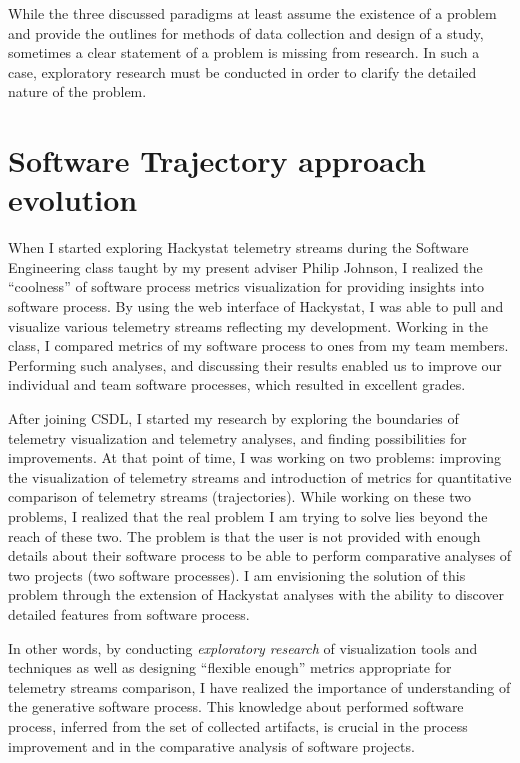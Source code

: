 While the three discussed paradigms at least assume the existence of a problem and provide the outlines for methods of data collection and design of a study, sometimes a clear statement of a problem is missing from research. In such a case, exploratory research must be conducted in order to clarify the detailed nature of the problem.

\section{Software Trajectory approach evolution}
When I started exploring Hackystat telemetry streams during the Software Engineering class taught by my present adviser Philip Johnson, I realized the ``coolness'' of software process metrics visualization for providing insights into software process. By using the web interface of Hackystat, I was able to pull and visualize various telemetry streams reflecting my development. Working in the class, I compared metrics of my software process to ones from my team members. Performing such analyses, and discussing their results enabled us to improve our individual and team software processes, which resulted in excellent grades. 

After joining CSDL, I started my research by exploring the boundaries of telemetry visualization and telemetry analyses, and finding possibilities for improvements. At that point of time, I was working on two problems: improving the visualization of telemetry streams and introduction of metrics for quantitative comparison of telemetry streams (trajectories). While working on these two problems, I realized that the real problem I am trying to solve lies beyond the reach of these two. The problem is that the user is not provided with enough details about their software process to be able to perform comparative analyses of two projects (two software processes). I am envisioning the solution of this problem through the extension of Hackystat analyses with the ability to discover detailed features from software process.

In other words, by conducting \textit{exploratory research} of visualization tools and techniques as well as designing ``flexible enough'' metrics appropriate for telemetry streams comparison, I have realized the importance of understanding of the generative software process. This knowledge about performed software process, inferred from the set of collected artifacts, is crucial in the process improvement and in the comparative analysis of software projects.

